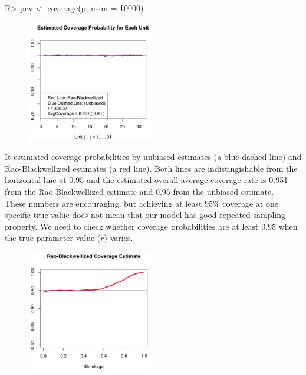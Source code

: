 \documentclass[article]{jss}
\begin{document}
\begin{CodeChunk}
\begin{CodeInput}
R> pcv <- coverage(p, nsim = 10000)
\end{CodeInput}
\end{CodeChunk}
\begin{figure}[h]
\begin{center}
\includegraphics[width = 5.5cm]{hospital2.png}
\end{center}
\end{figure}

It estimated coverage probabilities by unbiased estimates (a blue dashed line) and Rao-Blackwellized estimates (a red line). Both lines are indistingishable from the horizontal line at 0.95 and the estimated overall average coverage rate is 0.951 from the Rao-Blackwellized estimate and 0.95 from the unbiased estimate. 
\\

These numbers are encouraging, but achieving at least 95\% coverage at one specific true value does not mean that our model has good repeated sampling property. We need to check whether coverage probabilities are at least 0.95 when the true parameter value ($r$) varies.

\begin{CodeChunk}
\end{CodeChunk}
\begin{figure}[h]
\begin{center}
\includegraphics[width = 5.5cm]{hospital3.png}
\end{center}
\end{figure}
\end{document}
